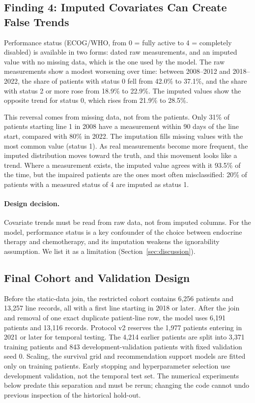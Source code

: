 \documentclass[a4paper,10pt]{article}
\begin{document}
\subsection{Finding 4: Imputed Covariates Can Create False Trends}

Performance status (ECOG/WHO, from 0 = fully active to 4 = completely disabled) is available in two forms: dated raw measurements, and an imputed value with no missing data, which is the one used by the model. The raw measurements show a modest worsening over time: between 2008--2012 and 2018--2022, the share of patients with status 0 fell from 42.0\% to 37.1\%, and the share with status 2 or more rose from 18.9\% to 22.9\%. The imputed values show the opposite trend for status 0, which rises from 21.9\% to 28.5\%.

This reversal comes from missing data, not from the patients. Only 31\% of patients starting line 1 in 2008 have a measurement within 90 days of the line start, compared with 80\% in 2022. The imputation fills missing values with the most common value (status 1). As real measurements become more frequent, the imputed distribution moves toward the truth, and this movement looks like a trend. Where a measurement exists, the imputed value agrees with it 93.5\% of the time, but the impaired patients are the ones most often misclassified: 20\% of patients with a measured status of 4 are imputed as status 1.

\paragraph{Design decision.} Covariate trends must be read from raw data, not from imputed columns. For the model, performance status is a key confounder of the choice between endocrine therapy and chemotherapy, and its imputation weakens the ignorability assumption. We list it as a limitation (Section~\ref{sec:discussion}).

\subsection{Final Cohort and Validation Design}
\label{sec:cohort}

Before the static-data join, the restricted cohort contains 6,256 patients and 13,257 line records, all with a first line starting in 2018 or later. After the join and removal of one exact duplicate patient-line row, the model uses 6,191 patients and 13,116 records. Protocol v2 reserves the 1,977 patients entering in 2021 or later for temporal testing. The 4,214 earlier patients are split into 3,371 training patients and 843 development-validation patients with fixed validation seed 0. Scaling, the survival grid and recommendation support models are fitted only on training patients. Early stopping and hyperparameter selection use development validation, not the temporal test set. The numerical experiments below predate this separation and must be rerun; changing the code cannot undo previous inspection of the historical hold-out.
\end{document}
